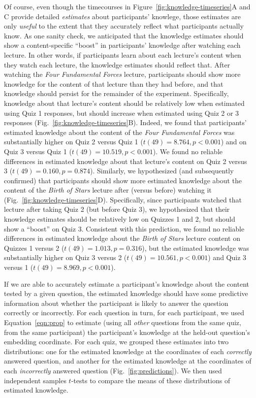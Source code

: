\documentclass[10pt]{article}
\begin{document}
Of course, even though the timecourses in
Figure~\ref{fig:knowledge-timeseries}A and C provide detailed
\textit{estimates} about participants' knowlege, those estimates are only
\textit{useful} to the extent that they accurately reflect what participants
actually know. As one sanity check, we anticipated that the knowledge estimates
should show a content-specific ``boost'' in participants' knowledge after
watching each lecture. In other words, if participants learn about each
lecture's content when they watch each lecture, the knowledge estimates should
reflect that. After watching the \textit{Four Fundamental Forces} lecture,
participants should show more knowledge for the content of that lecture than
they had before, and that knowledge should persist for the remainder of the
experiment. Specifically, knowledge about that lecture's content should be
relatively low when estimated using Quiz 1 responses, but should increase when
estimated using Quiz 2 or 3 responses (Fig.~\ref{fig:knowledge-timeseries}B).
Indeed, we found that participants' estimated knowledge about the content of
the \textit{Four Fundamental Forces} was substantially higher on Quiz 2 versus
Quiz 1 ($t(49) = 8.764, p < 0.001$) and on Quiz 3 versus Quiz 1 ($t(49) =
10.519, p < 0.001$). We found no reliable differences in estimated knowledge
about that lecture's content on Quiz 2 versus 3 ($t(49) = 0.160, p = 0.874$).
Similarly, we hypothesized (and subsequently confirmed) that participants
should show more estimated knowledge about the content of the \textit{Birth of
Stars} lecture after (versus before) watching it
(Fig.~\ref{fig:knowledge-timeseries}D). Specifically, since participants
watched that lecture after taking Quiz 2 (but before Quiz 3), we hypothesized
that their knowledge estimates should be relatively low on Quizzes 1 and 2, but
should show a ``boost'' on Quiz 3. Consistent with this prediction, we found no
reliable differences in estimated knowledge about the \textit{Birth of Stars}
lecture content on Quizzes 1 versus 2 ($t(49) = 1.013, p = 0.316$), but the
estimated knowledge was substantially higher on Quiz 3 versus 2 ($t(49) =
10.561, p < 0.001$) and Quiz 3 versus 1 ($t(49) = 8.969, p < 0.001$).

If we are able to accurately estimate a participant's knowledge about the
content tested by a given question, the estimated knowledge should have some
predictive information about whether the participant is likely to answer the
question correctly or incorrectly. For each question in turn, for each
participant, we used Equation~\ref{eqn:prop} to estimate (using all
\textit{other} questions from the same quiz, from the same participant) the
participant's knowledge at the held-out question's embedding coordinate. For
each quiz, we grouped these estimates into two distributions: one for the
estimated knowledge at the coordinates of each \textit{correctly} answered
question, and another for the estimated knowledge at the coordinates of each
\textit{incorrectly} answered question (Fig.~\ref{fig:predictions}). We then
used independent samples $t$-tests to compare the means of these distributions
of estimated knowledge.
\end{document}
